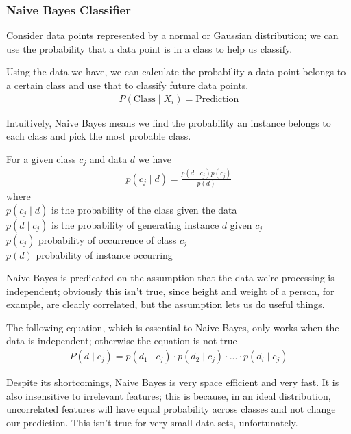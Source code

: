 \documentclass{chezarticle}
\begin{document}
\subsubsection{Naive Bayes Classifier}
Consider data points represented by a normal or Gaussian distribution; we can use the probability that a data point is in a class to help us classify.
\begin{proposition}
Using the data we have, we can calculate the probability a data point belongs to a certain class and use that to classify future data points.
\begin{align*}
 P(\text{Class} \mid X_i) = \text{Prediction}
\end{align*}
\end{proposition}
Intuitively, Naive Bayes means we find the probability an instance belongs to each class and pick the most probable class. 
\begin{definition}
For a given class $c_j$ and data $d$ we have
\begin{align*}
    p(c_j \mid d) = \frac{p(d \mid c_j) p(c_j)}{p(d)}
\end{align*}
where \\
$p(c_j \mid d)$ is the probability of the class given the data\\
$p(d \mid c_j) $ is the probability of generating instance $d$ given $c_j$\\
$p(c_j)$ probability of occurrence of class $c_j$\\
$p(d)$ probability of instance occurring\\
\end{definition}
Naive Bayes is predicated on the assumption that the data we're processing is independent; obviously this isn't true, since height and weight of a person, for example, are clearly correlated, but the assumption lets us do useful things.
\begin{definition}
The following equation, which is essential to Naive Bayes, only works when the data is independent; otherwise the equation is not true
\begin{align*}
    P(d \mid c_j) = p(d_1 \mid c_j) \cdot p(d_2 \mid c_j) \cdot ... \cdot p(d_i \mid c_j)
\end{align*}
\end{definition}
Despite its shortcomings, Naive Bayes is very space efficient and very fast. It is also insensitive to irrelevant features; this is because, in an ideal distribution, uncorrelated features will have equal probability across classes and not change our prediction. This isn't true for very small data sets, unfortunately. \\
\end{document}
